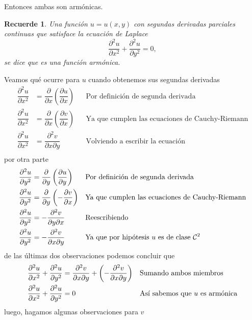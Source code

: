 \documentclass[letterpaper]{article}
\renewcommand{\d}{\partial}
\newtheorem*{remark}{Recuerde}
\renewcommand{\*}{\cdot}
\theoremstyle{definition}
\begin{document}
Entonces ambas son armónicas.
\begin{remark}
Una función $u = u(x,y)$ con segundas derivadas parciales continuas que satisface la ecuación de Laplace  $$ \dfrac{\partial^2 u}{\partial x^2} + \dfrac{\partial^2 u}{\partial y^2}= 0,$$ se dice que es una función armónica.
\end{remark}
\noindent Veamos qué ocurre para $ u $ cuando obtenemos sus segundas derivadas
\begin{align*}
	\dfrac{\d^2u}{\d x^2} &= \dfrac{\d}{\d x}\left( \dfrac{\d u}{\d x} \right) &&\text{Por definición de segunda derivada}\\
	\dfrac{\d^2u}{\d x^2} &= \dfrac{\d}{\d x}\left( \dfrac{\d v}{\d x} \right) &&\text{Ya que cumplen las ecuaciones de Cauchy-Riemann}\\
	\dfrac{\d^2u}{\d x^2} &= \dfrac{\d^2 v}{\d x\d y}  &&\text{Volviendo a escribir la ecuación}\\
\end{align*}
por otra parte
\begin{align*}
	\dfrac{\d^2u}{\d y^2} &= \dfrac{\d}{\d y}\left( \dfrac{\d u}{\d y} \right) &&\text{Por definición de segunda derivada}\\
	\dfrac{\d^2u}{\d y^2} &= \dfrac{\d}{\d y}\left( - \dfrac{\d v}{\d x} \right) &&\text{Ya que cumplen las ecuaciones de Cauchy-Riemann}\\
	\dfrac{\d^2u}{\d y^2} &= - \dfrac{\d^2 v}{\d y\d x}&&\text{Reescribiendo}\\
	\dfrac{\d^2u}{\d y^2} &= - \dfrac{\d^2 v}{\d x\d y}&&\text{Ya que por hipótesis $ u $ es de clase }\mathcal{C}^2\\
\end{align*}
de las últimas dos observaciones podemos concluir que
\begin{align*}
	\dfrac{\d^2u}{\d x^2} +\dfrac{\d^2u}{\d y^2} &= \dfrac{\d^2 v}{\d x\d y} +\left( - \dfrac{\d^2 v}{\d x\d y} \right)&&\text{Sumando ambos miembros }\\
	\dfrac{\d^2u}{\d x^2} +\dfrac{\d^2u}{\d y^2} &= 0  &&\text{Así sabemos que $ u $ es armónica}\\
\end{align*}
luego, hagamos algunas observaciones para $ v $
\end{document}
